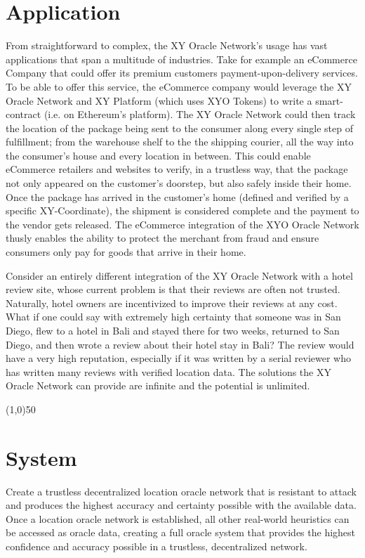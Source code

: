 \documentclass{article}
\begin{document}
\section*{Application}
From straightforward to complex, the XY Oracle Network's usage  has vast applications that span a multitude of industries. Take for example an eCommerce Company that could offer its premium customers payment-upon-delivery services. To be able to offer this service, the eCommerce company would leverage the XY Oracle Network and XY Platform (which uses XYO Tokens) to write a \gls{smart-contract} (i.e. on Ethereum's platform). The XY Oracle Network could then track the location of the package being sent to the consumer along every single step of fulfillment; from the warehouse shelf to the the shipping courier, all the way into the consumer's house and every location in between. This could enable eCommerce retailers and websites to verify, in a trustless way, that the package not only appeared on the customer's doorstep, but also safely inside their home. Once the package has arrived in the customer's home (defined and verified by a specific XY-Coordinate), the shipment is considered complete and the payment to the vendor gets released. The eCommerce integration of the XYO Oracle Network thusly enables the ability to protect the merchant from fraud and ensure consumers only pay for goods that arrive in their home.

Consider an entirely different integration of the XY Oracle Network with a hotel review site, whose current problem is that their reviews are often not trusted. Naturally, hotel owners are incentivized to improve their reviews at any cost. What if one could say with extremely high \gls{certainty} that someone was in San Diego, flew to a hotel in Bali and stayed there for two weeks, returned to San Diego, and then wrote a review about their hotel stay in Bali? The review would have a very high reputation, especially if it was written by a serial reviewer who has written many reviews with verified location data. The solutions the XY Oracle Network can provide are infinite and the potential is unlimited.

\begin{center}
\line(1,0){50}
\end{center}

\section {System}
Create a trustless decentralized location \gls{oracle} network that is resistant to attack and produces the highest \gls{accuracy} and \gls{certainty} possible with the available data. Once a location oracle network is established, all other real-world \glspl{heuristic} can be accessed as oracle data, creating a full oracle system that provides the highest confidence and accuracy possible in a trustless, decentralized network.
\end{document}
